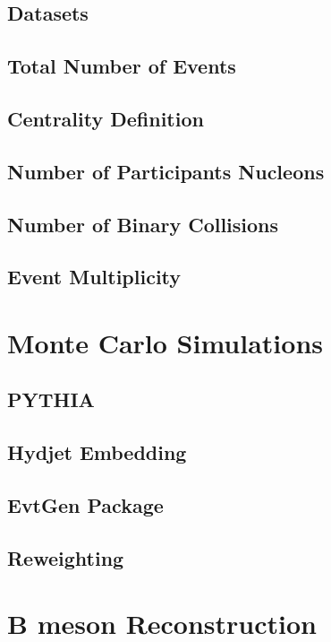 \subsection{Datasets}

\subsection{Total Number of Events}

\subsection{Centrality Definition}

\subsection{Number of Participants Nucleons}

\subsection{Number of Binary Collisions}

\subsection{Event Multiplicity}

\section{Monte Carlo Simulations} 

\subsection{PYTHIA}

\subsection{Hydjet Embedding}

\subsection{EvtGen Package}

\subsection{Reweighting}

\section{B meson Reconstruction} 


